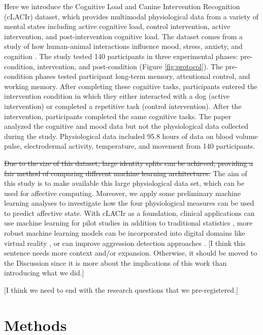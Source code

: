 \documentclass[12pt]{iopart}
\begin{document}
Here we introduce the Cognitive Load and Canine Intervention Recognition (cLACIr) dataset, which provides multimodal physiological data from a variety of mental states including active cognitive load, control intervention, active intervention, and post-intervention cognitive load. The dataset comes from a study of how human-animal interactions influence mood, stress, anxiety, and cognition \cite{thayer2022effects}. The study tested 140 participants in three experimental phases: pre-condition, intervention, and post-condition (Figure \ref{fig:protocol}). The pre-condition phases tested participant long-term memory, attentional control, and working memory.  After completing these cognitive tasks, participants entered the intervention condition in which they either interacted with a dog (active intervention) or completed a repetitive task (control intervention). After the intervention, participants completed the same cognitive tasks. The  paper analyzed the cognitive and mood data but not the physiological data collected during the study. Physiological data included 95.8 hours of data on blood volume pulse, electrodermal activity, temperature, and movement from 140 participants.


\sout{Due to the size of this dataset, large identity splits can be achieved, providing a fair method of comparing different machine learning architectures. } The aim of this study is to make available this large physiological data set, which can be used for affective computing. Moreover, we apply some preliminary machine learning analyses to investigate how the four physiological measures can be used to predict affective state. With cLACIr as a foundation, clinical applications can use machine learning for pilot studies in addition to traditional statistics \cite{phippsassessing}, more robust machine learning models can be incorporated into digital domains like virtual reality \cite{arce2021biosensor}, or can improve aggression detection approaches \cite{goodwin2019predicting, arce2023detecting}. [I think this sentence needs more context and/or expansion. Otherwise, it should be moved to the Discussion since it is more about the implications of this work than introducing what we did.]

[I think we need to end with the research questions that we pre-registered.]

\section*{Methods}
\end{document}
